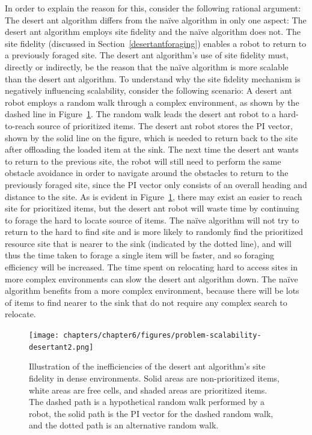 In order to explain the reason for this, consider the following rational argument: The desert ant algorithm differs from the na\"ive algorithm in only one aspect: The desert ant algorithm employs site fidelity and the na\"ive algorithm does not. The site fidelity (discussed in Section~\ref{desertantforaging}) enables a robot to return to a previously foraged site. The desert ant algorithm's use of site fidelity must, directly or indirectly, be the reason that the na\"ive algorithm is more scalable than the desert ant algorithm. To understand why the site fidelity mechanism is negatively influencing scalability, consider the following scenario: A desert ant robot employs a random walk through a complex environment, as shown by the dashed line in Figure~\ref{fig:desertantsitefidelity}. The random walk leads the desert ant robot to a hard-to-reach source of prioritized items. The desert ant robot stores the PI vector, shown by the solid line on the figure, which is needed to return back to the site after offloading the loaded item at the sink. The next time the desert ant wants to return to the previous site, the robot will still need to perform the same obstacle avoidance in order to navigate around the obstacles to return to the previously foraged site, since the PI vector only consists of an overall heading and distance to the site. As is evident in Figure~\ref{fig:desertantsitefidelity}, there may exist an easier to reach site for prioritized items, but the desert ant robot will waste time by continuing to forage the hard to locate source of items. The na\"ive algorithm will not try to return to the hard to find site and is more likely to randomly find the prioritized resource site that is nearer to the sink (indicated by the dotted line), and will thus the time taken to forage a single item will be faster, and so foraging efficiency will be increased. The time spent on relocating hard to access sites in more complex environments can slow the desert ant algorithm down. The na\"ive algorithm benefits from a more complex environment, because there will be lots of items to find nearer to the sink that do not require any complex search to relocate. 

\begin{figure}[!htbp]
    \centering
    \texttt{[image: chapters/chapter6/figures/problem-scalability-desertant2.png]}
    \caption{Illustration of the inefficiencies of the desert ant algorithm's site fidelity in dense environments. Solid areas are non-prioritized items, white areas are free cells, and shaded areas are prioritized items. The dashed path is a hypothetical random walk performed by a robot, the solid path is the PI vector for the dashed random walk, and the dotted path is an alternative random walk.}
    \label{fig:desertantsitefidelity}
\end{figure}

